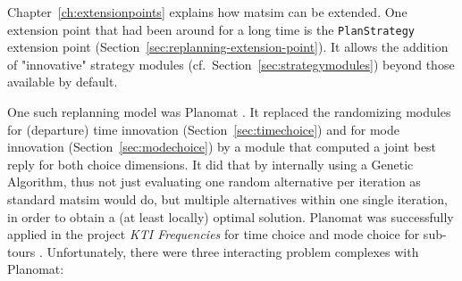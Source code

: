 Chapter~\ref{ch:extensionpoints} explains how \gls{matsim} can be extended.  One extension point that had been around for a long time is the \lstinline{PlanStrategy} extension point (Section~\ref{sec:replanning-extension-point}).  It allows the addition of "innovative" strategy modules (cf.\ Section~\ref{sec:strategymodules}) beyond those available by default.

One such replanning model was Planomat \citep[][]{MeisterEtAl_IATBR_2006, MeisterEtAl_STRC_2006, Meister_PhDThesis_2011}.  It replaced the randomizing modules  for (departure) time innovation (Section~\ref{sec:timechoice}) and for mode innovation (Section~\ref{sec:modechoice}) by a module that computed a joint best reply for both choice dimensions.  It did that by internally using a Genetic Algorithm, thus 
not just evaluating one random alternative per iteration as standard \gls{matsim} would do, but multiple alternatives within one single iteration, in order to obtain a (at least locally) optimal solution. 
Planomat was successfully applied in the 
project \emph{KTI Frequencies} for time choice and mode choice for sub-tours \citep[][p.10]{BalmerEtAl_ResRep_datapuls_2010}.
Unfortunately, there were three interacting problem complexes with Planomat:
